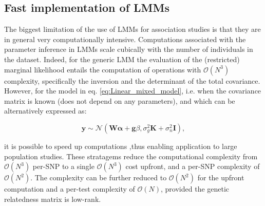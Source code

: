 \newpage

\subsection{Fast implementation of LMMs}
\label{sec:fast_lmm}

The biggest limitation of the use of LMMs for association studies is that they are in general very computationally intensive.
Computations associated with the parameter inference in LMMs scale cubically with
the number of individuals in the dataset. 
Indeed, for the generic LMM
the evaluation of the (restricted) marginal likelihood entails the computation of operations with $\mathcal{O}(N^3)$ complexity, specifically the inversion and the determinant of the total covariance. %
However, for the model in eq. \eqref{eq:Linear_mixed_model}, i.e. when the covariance matrix is known (does not depend on any parameters), and which can be alternatively expressed as:

\begin{equation}\label{eq:LMM_MVN}
 \mathbf{y} \sim  \mathcal{N}(\mathbf{W}\boldsymbol{\alpha} + \mathbf{g}\beta, \sigma_g^2\mathbf{K} + \sigma_n^2\mathbf{I}),
\end{equation}

it is possible to speed up computations \cite{kang2008efficient, kang2010variance, lippert2011fast, zhou2012genome} ,thus enabling application to large population studies. 
These stratagems reduce the computational complexity from $\mathcal{O}(N^3)$
per-SNP to a single  $\mathcal{O}(N^3)$ cost upfront, and a per-SNP complexity of  $\mathcal{O}(N^2)$.
The complexity can be further reduced to $\mathcal{O}(N^2)$ for the upfront computation and a per-test complexity of  $\mathcal{O}(N)$, provided the genetic relatedness matrix is low-rank. \\



